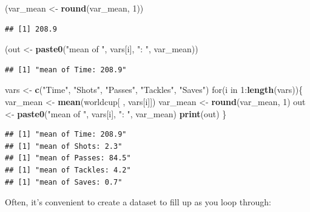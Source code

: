 \documentclass[]{book}
\makeatletter
\newenvironment{Shaded}{\begin{snugshade}}{\end{snugshade}}
\newcommand{\KeywordTok}[1]{\textcolor[rgb]{0.13,0.29,0.53}{\textbf{{#1}}}}
\newcommand{\DecValTok}[1]{\textcolor[rgb]{0.00,0.00,0.81}{{#1}}}
\newcommand{\StringTok}[1]{\textcolor[rgb]{0.31,0.60,0.02}{{#1}}}
\newcommand{\NormalTok}[1]{{#1}}
\newenvironment{kframe}{%
\medskip{}
\setlength{\fboxsep}{.8em}
 \def\at@end@of@kframe{}%
 \ifinner\ifhmode%
  \def\at@end@of@kframe{\end{minipage}}%
  \begin{minipage}{\columnwidth}%
 \fi\fi%
 \def\FrameCommand##1{\hskip\@totalleftmargin \hskip-\fboxsep
 \colorbox{shadecolor}{##1}\hskip-\fboxsep
     \hskip-\linewidth \hskip-\@totalleftmargin \hskip\columnwidth}%
 \MakeFramed {\advance\hsize-\width
   \@totalleftmargin\z@ \linewidth\hsize
   \@setminipage}}%
 {\par\unskip\endMakeFramed%
 \at@end@of@kframe}
\renewenvironment{Shaded}{\begin{kframe}}{\end{kframe}}
\makeatother
\begin{document}
\begin{Shaded}
\begin{Highlighting}[]
\NormalTok{(var_mean <-}\StringTok{ }\KeywordTok{round}\NormalTok{(var_mean, }\DecValTok{1}\NormalTok{))}
\end{Highlighting}
\end{Shaded}

\begin{verbatim}
## [1] 208.9
\end{verbatim}

\begin{Shaded}
\begin{Highlighting}[]
\NormalTok{(out <-}\StringTok{ }\KeywordTok{paste0}\NormalTok{(}\StringTok{"mean of "}\NormalTok{, vars[i], }\StringTok{": "}\NormalTok{, var_mean))}
\end{Highlighting}
\end{Shaded}

\begin{verbatim}
## [1] "mean of Time: 208.9"
\end{verbatim}

\begin{Shaded}
\begin{Highlighting}[]
\NormalTok{vars <-}\StringTok{ }\KeywordTok{c}\NormalTok{(}\StringTok{"Time"}\NormalTok{, }\StringTok{"Shots"}\NormalTok{, }\StringTok{"Passes"}\NormalTok{, }\StringTok{"Tackles"}\NormalTok{, }\StringTok{"Saves"}\NormalTok{)}
\NormalTok{for(i in }\DecValTok{1}\NormalTok{:}\KeywordTok{length}\NormalTok{(vars))\{}
        \NormalTok{var_mean <-}\StringTok{ }\KeywordTok{mean}\NormalTok{(worldcup[ , vars[i]])}
        \NormalTok{var_mean <-}\StringTok{ }\KeywordTok{round}\NormalTok{(var_mean, }\DecValTok{1}\NormalTok{)}
        \NormalTok{out <-}\StringTok{ }\KeywordTok{paste0}\NormalTok{(}\StringTok{"mean of "}\NormalTok{, vars[i], }\StringTok{": "}\NormalTok{, var_mean)}
        \KeywordTok{print}\NormalTok{(out)}
\NormalTok{\}}
\end{Highlighting}
\end{Shaded}

\begin{verbatim}
## [1] "mean of Time: 208.9"
## [1] "mean of Shots: 2.3"
## [1] "mean of Passes: 84.5"
## [1] "mean of Tackles: 4.2"
## [1] "mean of Saves: 0.7"
\end{verbatim}

Often, it's convenient to create a dataset to fill up as you loop
through:
\end{document}

